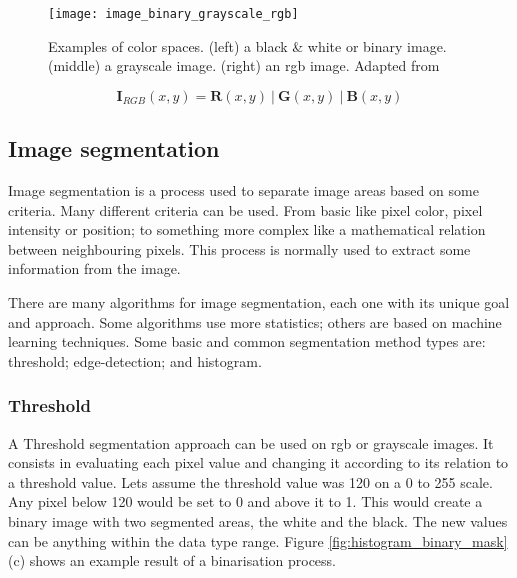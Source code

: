 \begin{figure}[htbp]
	\centering
	\texttt{[image: image\_binary\_grayscale\_rgb]}
	\caption{Examples of color spaces. (left) a black \& white or binary image. (middle) a grayscale image. (right) an \gls{rgb} image. Adapted from \cite{Fonseca2017_acondicionamento_imagem}}
	\label{fig:image_binary_grayscale_rgb}
\end{figure}

\begin{equation}
\boldsymbol{I}_{RGB}(x,y) = \boldsymbol{R}(x,y) \: | \: \boldsymbol{G}(x,y) \: | \: \boldsymbol{B}(x,y)
\label{eq:rgb_image_matrix}
\end{equation}


\subsection{Image segmentation}
\label{subsec:image_segmentation}

Image segmentation is a process used to separate image areas based on some criteria. Many different criteria can be used. From basic like pixel color, pixel intensity or position; to something more complex like a mathematical relation between neighbouring pixels. This process is normally used to extract some information from the image.

There are many algorithms for image segmentation, each one with its unique goal and approach. Some algorithms use more statistics; others are based on machine learning techniques. Some basic and common segmentation method types are: threshold; edge-detection; and histogram.

\subsubsection*{Threshold}
\label{subsubsec:image_segmentation_threshold}

A Threshold segmentation approach can be used on \gls{rgb} or grayscale images. It consists in evaluating each pixel value and changing it according to its relation to a threshold value. Lets assume the threshold value was 120 on a 0 to 255 scale. Any pixel below 120 would be set to 0 and above it to 1. This would create a binary image with two segmented areas, the white and the black. The new values can be anything within the data type range. Figure \ref{fig:histogram_binary_mask} (c) shows an example result of a binarisation process.

